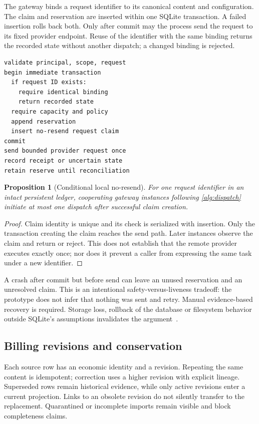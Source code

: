 \documentclass[10pt,twocolumn]{article}
\newtheorem{proposition}{Proposition}
\begin{document}
The gateway binds a request identifier to its canonical content and configuration. The claim and reservation are inserted within one SQLite transaction. A failed insertion rolls back both. Only after commit may the process send the request to its fixed provider endpoint. Reuse of the identifier with the same binding returns the recorded state without another dispatch; a changed binding is rejected.

\begin{lstlisting}[style=palo,caption={Simplified local admission protocol. Network execution is outside the database transaction.},label={alg:dispatch}]
validate principal, scope, request
begin immediate transaction
  if request ID exists:
    require identical binding
    return recorded state
  require capacity and policy
  append reservation
  insert no-resend request claim
commit
send bounded provider request once
record receipt or uncertain state
retain reserve until reconciliation
\end{lstlisting}

\begin{proposition}[Conditional local no-resend]
For one request identifier in an intact persistent ledger, cooperating gateway instances following \cref{alg:dispatch} initiate at most one dispatch after successful claim creation.
\end{proposition}
\begin{proof}
Claim identity is unique and its check is serialized with insertion. Only the transaction creating the claim reaches the send path. Later instances observe the claim and return or reject. This does not establish that the remote provider executes exactly once; nor does it prevent a caller from expressing the same task under a new identifier.
\end{proof}

A crash after commit but before send can leave an unused reservation and an unresolved claim. This is an intentional safety-versus-liveness tradeoff: the prototype does not infer that nothing was sent and retry. Manual evidence-based recovery is required. Storage loss, rollback of the database or filesystem behavior outside SQLite's assumptions invalidates the argument~\cite{sqlite}.

\subsection{Billing revisions and conservation}

Each source row has an economic identity and a revision. Repeating the same content is idempotent; correction uses a higher revision with explicit lineage. Superseded rows remain historical evidence, while only active revisions enter a current projection. Links to an obsolete revision do not silently transfer to the replacement. Quarantined or incomplete imports remain visible and block completeness claims.
\end{document}

